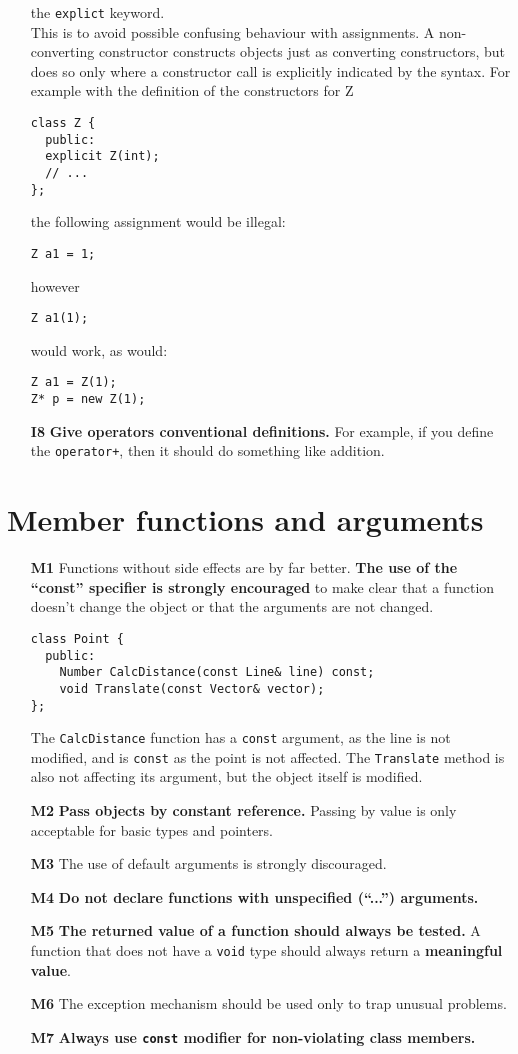 \documentclass[a4paper,10pt]{article}
\begin{document}
\begin{itemize}
  the {\tt explict} keyword.\\
  This is to avoid possible confusing behaviour with assignments. A
  non-converting constructor constructs objects just as converting
  constructors, but does so only where a constructor call is explicitly
  indicated by the syntax. For example with the definition of the
  constructors for Z
  \begin{verbatim}
class Z {
  public:
  explicit Z(int);
  // ...
};
  \end{verbatim}
  the following assignment would be illegal:
  \begin{verbatim}
Z a1 = 1;
  \end{verbatim}
  however
  \begin{verbatim}
Z a1(1);
  \end{verbatim}
  would work, as would:
  \begin{verbatim}
Z a1 = Z(1);
Z* p = new Z(1);
  \end{verbatim}
\item[\bf I8] {\bf Give operators conventional definitions.} For example,
  if you define the {\tt operator+}, then it should do something like addition.

\end{itemize}

\section{Member functions and arguments}
\begin{itemize}
\item[\bf M1] Functions without side effects are by far better. {\bf The use
  of the ``const'' specifier is strongly encouraged} to make clear that a
  function doesn't change the object or that the arguments are not changed.
  \begin{verbatim}
class Point {
  public:
    Number CalcDistance(const Line& line) const;
    void Translate(const Vector& vector);
};
  \end{verbatim}
  The {\tt CalcDistance} function has a {\tt const} argument, as the line is
  not modified, and is {\tt const} as the point is not affected. The
  {\tt Translate} method is also not affecting its argument, but the object
  itself is modified.
\item[\bf M2] {\bf Pass objects by constant reference.} Passing by value is
  only acceptable for basic types and pointers.
\item[\bf M3] The use of default arguments is strongly discouraged.
\item[\bf M4] {\bf Do not declare functions with unspecified (``...'')
  arguments.}
\item[\bf M5] {\bf The returned value of a function should always be tested.}
  A function that does not have a {\tt void} type should always return a
  {\bf meaningful value}.
\item[\bf M6] The exception mechanism should be used only to trap unusual
  problems.
\item[\bf M7] {\bf Always use {\tt const} modifier for non-violating class
  members.}
\end{itemize}
\end{document}
